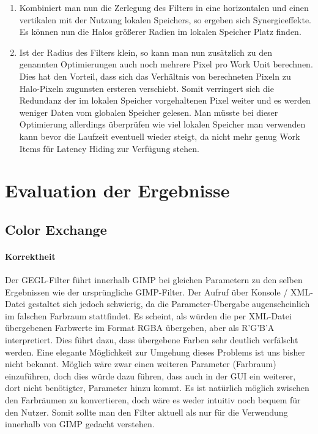 \documentclass[10pt,a4paper]{article}
\begin{document}
\begin{enumerate}

\item Kombiniert man nun die Zerlegung des Filters in eine horizontalen und einen vertikalen mit der Nutzung lokalen Speichers, so ergeben sich Synergieeffekte. Es können nun die Halos größerer Radien im lokalen Speicher Platz finden.

\item Ist der Radius des Filters klein, so kann man nun zusätzlich zu den genannten Optimierungen auch noch mehrere Pixel pro Work Unit berechnen. Dies hat den Vorteil, dass sich das Verhältnis von berechneten Pixeln zu Halo-Pixeln zugunsten ersteren verschiebt. Somit verringert sich die Redundanz der im lokalen Speicher vorgehaltenen Pixel weiter und es werden weniger Daten vom globalen Speicher gelesen. Man müsste bei dieser Optimierung allerdings überprüfen wie viel lokalen Speicher man verwenden kann bevor die Laufzeit eventuell wieder steigt, da nicht mehr genug Work Items für Latency Hiding zur Verfügung stehen.
\end{enumerate}

\section{Evaluation der Ergebnisse}
\subsection{Color Exchange}
\paragraph{Korrektheit}
Der GEGL-Filter führt innerhalb GIMP bei gleichen Parametern zu den selben Ergebnissen wie der ursprüngliche GIMP-Filter. Der Aufruf über Konsole / XML-Datei gestaltet sich jedoch schwierig, da die Parameter-Übergabe augenscheinlich im falschen Farbraum stattfindet. Es scheint, als würden die per XML-Datei übergebenen Farbwerte im Format RGBA übergeben, aber als R'G'B'A interpretiert. Dies führt dazu, dass übergebene Farben sehr deutlich verfälscht werden. Eine elegante Möglichkeit zur Umgehung dieses Problems ist uns bisher nicht bekannt. Möglich wäre zwar einen weiteren Parameter (Farbraum) einzuführen, doch dies würde dazu führen, dass auch in der GUI ein weiterer, dort nicht benötigter, Parameter hinzu kommt. Es ist natürlich möglich zwischen den Farbräumen zu konvertieren, doch wäre es weder intuitiv noch bequem für den Nutzer. Somit sollte man den Filter aktuell als nur für die Verwendung innerhalb von GIMP gedacht verstehen.
\end{document}
